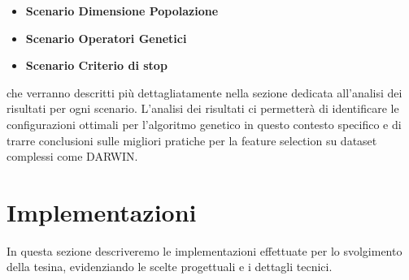 \documentclass[11pt,a4paper]{article}
\begin{document}
\begin{itemize}
  \item \textbf{Scenario Dimensione Popolazione} 
  \item \textbf{Scenario Operatori Genetici} 
  \item \textbf{Scenario Criterio di stop} 
\end{itemize}
che verranno descritti più dettagliatamente nella sezione dedicata all'analisi dei risultati per ogni scenario. L'analisi dei risultati ci permetterà di identificare le configurazioni ottimali per l'algoritmo genetico in questo contesto specifico e di trarre conclusioni sulle migliori pratiche per la feature selection su dataset complessi come DARWIN.
\section{Implementazioni}
In questa sezione descriveremo le implementazioni effettuate per lo svolgimento della tesina, evidenziando le scelte progettuali e i dettagli tecnici.
\end{document}

